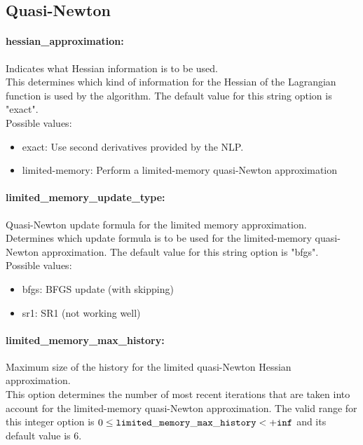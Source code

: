 \subsection{Quasi-Newton}

\paragraph{hessian\_approximation:}\label{opt:hessian_approximation} Indicates what Hessian information is to be used. \\
 This determines which kind of information for the
Hessian of the Lagrangian function is used by the
algorithm. The default value for this string option is "exact".
\\ 
Possible values:
\begin{itemize}
   \item exact: Use second derivatives provided by the NLP.
   \item limited-memory: Perform a limited-memory quasi-Newton
approximation
\end{itemize}

\paragraph{limited\_memory\_update\_type:}\label{opt:limited_memory_update_type} Quasi-Newton update formula for the limited memory approximation. \\
 Determines which update formula is to be used for
the limited-memory quasi-Newton approximation. The default value for this string option is "bfgs".
\\ 
Possible values:
\begin{itemize}
   \item bfgs: BFGS update (with skipping)
   \item sr1: SR1 (not working well)
\end{itemize}

\paragraph{limited\_memory\_max\_history:}\label{opt:limited_memory_max_history} Maximum size of the history for the limited quasi-Newton Hessian approximation. \\
 This option determines the number of most recent
iterations that are taken into account for the
limited-memory quasi-Newton approximation. The valid range for this integer option is
$0 \le {\tt limited\_memory\_max\_history } <  {\tt +inf}$
and its default value is $6$.


